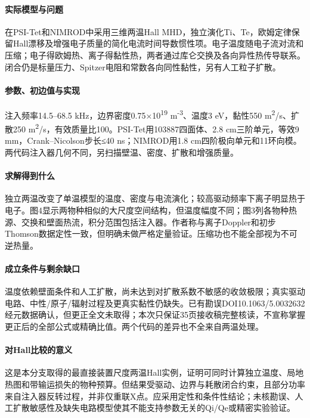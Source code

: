 \paragraph{实际模型与问题}在PSI-Tet和NIMROD中采用三维两温Hall MHD，独立演化Ti、Te，欧姆定律保留Hall漂移及增强电子质量的简化电流时间导数惯性项。电子温度随电子流对流和压缩；电子得欧姆热、离子得黏性热，两者通过库仑交换及各向异性热传导联系。闭合仍是标量压力、Spitzer电阻和常数各向同性黏性，另有人工粒子扩散。

\paragraph{参数、初边值与实现}注入频率14.5–68.5 kHz，边界密度0.75×10\textsuperscript{19} m\textsuperscript{-3}、温度3 eV，黏性550 m\textsuperscript{2}/s、扩散250 m\textsuperscript{2}/s，有效质量比100。PSI-Tet用103887四面体、2.8 cm三阶单元，等效9 mm，Crank–Nicolson步长≤40 ns；NIMROD用1.8 cm四阶极向单元和11环向模。两代码注入器几何不同，另扫描壁温、密度、扩散和增强质量。

\paragraph{求解得到什么}独立两温改变了单温模型的温度、密度与电流演化；较高驱动频率下离子明显热于电子。图4显示两物种相似的大尺度空间结构，但温度幅度不同；图3列各物种热源、交换和壁面热流，积分范围包括注入器。作者称与离子Doppler和初步Thomson数据定性一致，但明确未做严格定量验证。压缩功也不能全部视为不可逆热量。

\paragraph{成立条件与剩余缺口}温度依赖壁面条件和人工扩散，尚未达到对扩散系数不敏感的收敛极限；真实驱动电路、中性/原子/辐射过程及更真实黏性仍缺失。已有勘误DOI10.1063/5.0032632经元数据确认，但更正全文未取得；本次只保证35页接收稿完整核读，不宣称掌握更正后的全部公式或精确比值。两个代码的差异也不全来自两温处理。

\paragraph{对Hall比较的意义}这是本分支取得的最直接装置尺度两温Hall实例，证明可同时计算独立温度、局地热图和带输运损失的物种预算。但结果受驱动、边界与耗散闭合约束，且部分功率来自注入器反转过程，并非仅重联X点。应采用定性和条件性结论；未核勘误、人工扩散敏感性及缺失电路模型使其不能支持参数无关的Qi/Qe或精密实验验证。

